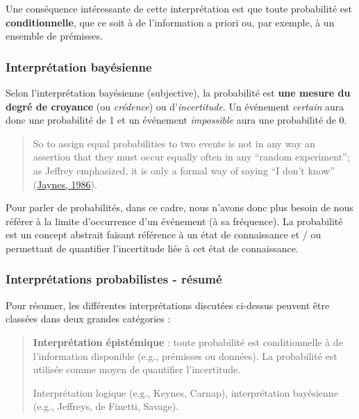 \documentclass[
  a4paper,11pt,twoside,onecolumn,openright,final,oldfontcommands]{memoir}
\theoremstyle{definition}
\theoremstyle{definition}
\theoremstyle{definition}
\theoremstyle{remark}
\begin{document}
Une conséquence intéressante de cette interprétation est que toute probabilité est \textbf{conditionnelle}, que ce soit à de l'information a priori ou, par exemple, à un ensemble de prémisses.

\hypertarget{interpruxe9tation-bayuxe9sienne}{%
\subsubsection{Interprétation bayésienne}\label{interpruxe9tation-bayuxe9sienne}}

Selon l'interprétation bayésienne (subjective), la probabilité est \textbf{une mesure du degré de croyance} (ou \emph{crédence}) ou d'\emph{incertitude}. Un événement \emph{certain} aura donc une probabilité de 1 et un événement \emph{impossible} aura une probabilité de 0.

\begin{quote}
So to assign equal probabilities to two events is not in any way an assertion that they must occur equally often in any ``random experiment''; as Jeffrey emphasized, it is only a formal way of saying ``I don't know'' (\protect\hyperlink{ref-jaynes_bayesian_1986}{Jaynes, 1986}).
\end{quote}

Pour parler de probabilités, dans ce cadre, nous n'avons donc plus besoin de nous référer à la limite d'occurrence d'un événement (à sa fréquence). La probabilité est un concept abstrait faisant référence à un état de connaissance et / ou permettant de quantifier l'incertitude liée à cet état de connaissance.

\hypertarget{interpruxe9tations-probabilistes---ruxe9sumuxe9}{%
\subsubsection{Interprétations probabilistes - résumé}\label{interpruxe9tations-probabilistes---ruxe9sumuxe9}}

Pour résumer, les différentes interprétations discutées ci-dessus peuvent être classées dans deux grandes catégories :

\begin{quote}
\textbf{Interprétation épistémique} : toute probabilité est conditionnelle à de l'information disponible (e.g., prémisses ou données). La probabilité est utilisée comme moyen de quantifier l'incertitude.

Interprétation logique (e.g., Keynes, Carnap), interprétation bayésienne (e.g., Jeffreys, de Finetti, Savage).
\end{quote}
\end{document}
